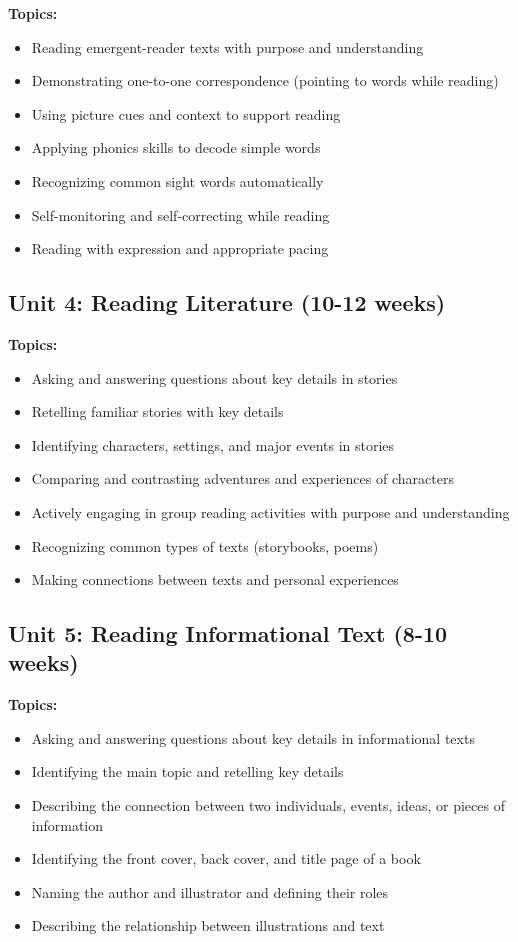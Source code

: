 \documentclass[11pt,letterpaper]{report}
\begin{document}
\textbf{Topics:}
\begin{itemize}
    \item Reading emergent-reader texts with purpose and understanding
    \item Demonstrating one-to-one correspondence (pointing to words while reading)
    \item Using picture cues and context to support reading
    \item Applying phonics skills to decode simple words
    \item Recognizing common sight words automatically
    \item Self-monitoring and self-correcting while reading
    \item Reading with expression and appropriate pacing
\end{itemize}

\subsection{Unit 4: Reading Literature (10-12 weeks)}

\textbf{Topics:}
\begin{itemize}
    \item Asking and answering questions about key details in stories
    \item Retelling familiar stories with key details
    \item Identifying characters, settings, and major events in stories
    \item Comparing and contrasting adventures and experiences of characters
    \item Actively engaging in group reading activities with purpose and understanding
    \item Recognizing common types of texts (storybooks, poems)
    \item Making connections between texts and personal experiences
\end{itemize}

\subsection{Unit 5: Reading Informational Text (8-10 weeks)}

\textbf{Topics:}
\begin{itemize}
    \item Asking and answering questions about key details in informational texts
    \item Identifying the main topic and retelling key details
    \item Describing the connection between two individuals, events, ideas, or pieces of information
    \item Identifying the front cover, back cover, and title page of a book
    \item Naming the author and illustrator and defining their roles
    \item Describing the relationship between illustrations and text
\end{itemize}
\end{document}
